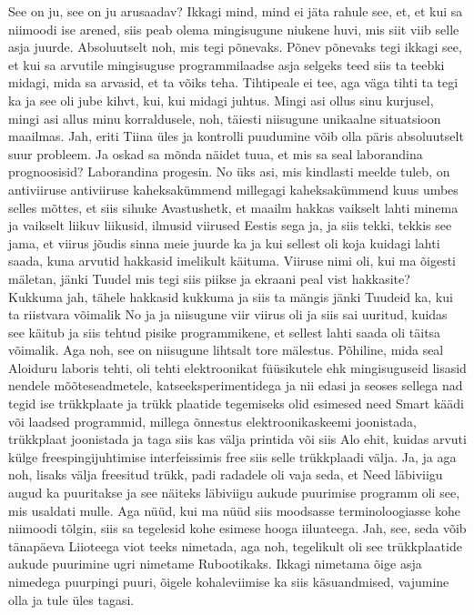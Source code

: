 See on ju, see on ju arusaadav? Ikkagi mind, mind ei jäta rahule see, et, et kui sa niimoodi ise arened, siis peab olema mingisugune niukene huvi, mis siit viib selle asja juurde.
Absoluutselt noh, mis tegi põnevaks. Põnev põnevaks tegi ikkagi see, et kui sa arvutile mingisuguse programmilaadse asja selgeks teed siis ta teebki midagi, mida sa arvasid, et ta võiks teha. Tihtipeale ei tee, aga väga tihti ta tegi ka ja see oli jube kihvt, kui, kui midagi juhtus. Mingi asi ollus sinu kurjusel, mingi asi allus minu korraldusele, noh, täiesti niisugune unikaalne situatsioon maailmas.
Jah, eriti Tiina üles ja kontrolli puudumine võib olla päris absoluutselt suur probleem. Ja oskad sa mõnda näidet tuua, et mis sa seal laborandina prognoosisid?
Laborandina progesin. No üks asi, mis kindlasti meelde tuleb, on antiviiruse antiviiruse kaheksakümmend millegagi kaheksakümmend kuus umbes selles mõttes, et siis sihuke
Avastushetk, et maailm hakkas vaikselt lahti minema ja vaikselt liikuv liikusid, ilmusid viirused Eestis sega ja, ja siis tekki, tekkis see jama, et viirus jõudis sinna meie juurde ka ja kui sellest oli koja kuidagi lahti saada, kuna arvutid hakkasid imelikult käituma. Viiruse nimi oli, kui ma õigesti mäletan, jänki Tuudel mis tegi siis piikse ja ekraani peal vist hakkasite?
Kukkuma jah, tähele hakkasid kukkuma ja siis ta mängis jänki Tuudeid ka, kui ta riistvara võimalik
No ja ja niisugune viir viirus oli ja siis sai uuritud, kuidas see käitub ja siis tehtud pisike programmikene, et sellest lahti saada oli täitsa võimalik. Aga noh, see on niisugune lihtsalt tore mälestus. Põhiline, mida seal Aloiduru laboris tehti, oli tehti elektroonikat füüsikutele ehk mingisuguseid lisasid nendele mõõteseadmetele, katseeksperimentidega ja nii edasi ja seoses sellega nad tegid ise trükkplaate ja trükk plaatide tegemiseks olid esimesed need Smart käädi või laadsed programmid, millega õnnestus elektroonikaskeemi joonistada, trükkplaat joonistada ja taga siis kas välja printida või siis Alo ehit, kuidas arvuti külge freespingijuhtimise interfeissimis free siis selle trükkplaadi välja. Ja, ja aga noh, lisaks välja freesitud trükk, padi radadele oli vaja seda, et Need läbiviigu augud ka puuritakse ja see näiteks läbiviigu aukude puurimise programm oli see, mis usaldati mulle.
Aga nüüd, kui ma nüüd siis moodsasse terminoloogiasse kohe niimoodi tõlgin, siis sa tegelesid kohe esimese hooga iiluateega.
Jah, see, seda võib tänapäeva Liioteega viot teeks nimetada, aga noh, tegelikult oli see trükkplaatide aukude puurimine ugri nimetame Rubootikaks. Ikkagi nimetama õige asja nimedega puurpingi puuri, õigele kohaleviimise ka siis käsuandmised, vajumine olla ja tule üles tagasi.
